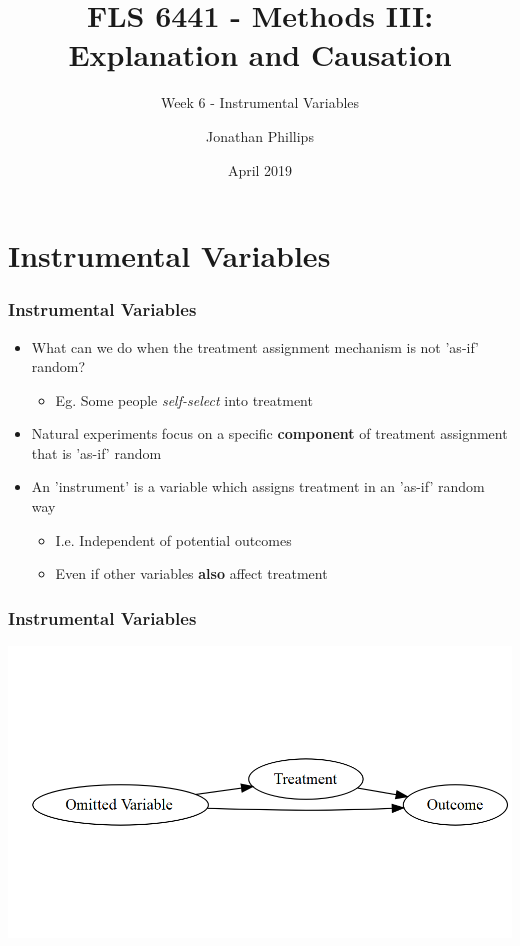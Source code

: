 \documentclass[xcolor=x11names,compress]{beamer}\usepackage[]{graphicx}\usepackage[]{color}
\title{FLS 6441 - Methods III: Explanation and Causation}
\subtitle{Week 6 - Instrumental Variables}
\author{Jonathan Phillips}
\date{April 2019}
\makeatletter
\def\maxwidth{ %
  \ifdim\Gin@nat@width>\linewidth
    \linewidth
  \else
    \Gin@nat@width
  \fi
}
\newenvironment{knitrout}{}{} %
\renewcommand{\(}{\begin{columns}}
\renewcommand{\)}{\end{columns}}
\newcommand{\<}[1]{\begin{column}{#1}}
\renewcommand{\>}{\end{column}}
\makeatother
\begin{document}
  

\frame{\titlepage}

\section{Instrumental Variables}

\begin{frame}
\frametitle{Instrumental Variables}
\begin{itemize}
\item What can we do when the treatment assignment mechanism is not 'as-if' random?
\pause
\begin{itemize}
\item Eg. Some people \textit{self-select} into treatment
\end{itemize}
\pause
\item Natural experiments focus on a specific \textbf{component} of treatment assignment that is 'as-if' random
\pause
\item An 'instrument' is a variable which assigns treatment in an 'as-if' random way
\pause
\begin{itemize}
\item I.e. Independent of potential outcomes
\item Even if other variables \textbf{also} affect treatment
\end{itemize}
\end{itemize}
\end{frame}

\begin{frame}
\frametitle{Instrumental Variables}
\begin{knitrout}
\color{fgcolor}
\includegraphics[width=\maxwidth]{figure/dag1-1} 

\end{knitrout}
\end{frame}
\end{document}
